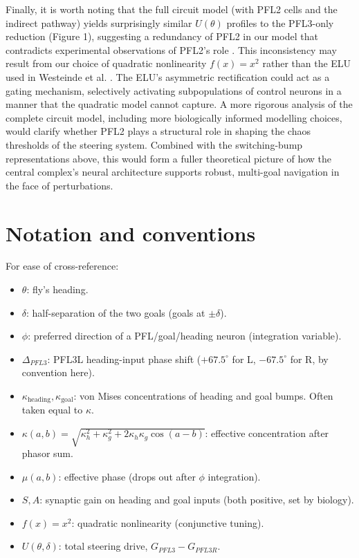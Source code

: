 \documentclass[11pt]{article}
\begin{document}
Finally, it is worth noting that the full circuit model (with PFL2 cells and the indirect pathway) yields surprisingly similar $U(\theta)$ profiles to the PFL3-only reduction (Figure 1), suggesting a redundancy of PFL2 in our model that contradicts experimental observations of PFL2's role \cite{westeinde2024}. This inconsistency may result from our choice of quadratic nonlinearity $f(x) = x^2$ rather than the ELU used in Westeinde et al. \cite{westeinde2024}. The ELU's asymmetric rectification could act as a gating mechanism, selectively activating subpopulations of control neurons in a manner that the quadratic model cannot capture. A more rigorous analysis of the complete circuit model, including more biologically informed modelling choices, would clarify whether PFL2 plays a structural role in shaping the chaos thresholds of the steering system. Combined with the switching-bump representations above, this would form a fuller theoretical picture of how the central complex's neural architecture supports robust, multi-goal navigation in the face of perturbations.

\section*{Notation and conventions}

For ease of cross-reference:

\begin{itemize}
\item $\theta$: fly's heading.
\item $\delta$: half-separation of the two goals (goals at $\pm\delta$).
\item $\phi$: preferred direction of a PFL/goal/heading neuron (integration variable).
\item $\Delta_{PFL3}$: PFL3L heading-input phase shift ($+67.5^\circ$ for L, $-67.5^\circ$ for R, by convention here).
\item $\kappa_{\text{heading}}, \kappa_{\text{goal}}$: von Mises concentrations of heading and goal bumps. Often taken equal to $\kappa$.
\item $\kappa(a, b) = \sqrt{\kappa_h^2 + \kappa_g^2 + 2\kappa_h\kappa_g\cos(a-b)}$: effective concentration after phasor sum.
\item $\mu(a, b)$: effective phase (drops out after $\phi$ integration).
\item $S, A$: synaptic gain on heading and goal inputs (both positive, set by biology).
\item $f(x) = x^2$: quadratic nonlinearity (conjunctive tuning).
\item $U(\theta, \delta)$: total steering drive, $G_{PFL3} - G_{PFL3R}$.
\end{itemize}




\printbibliography
\end{document}
